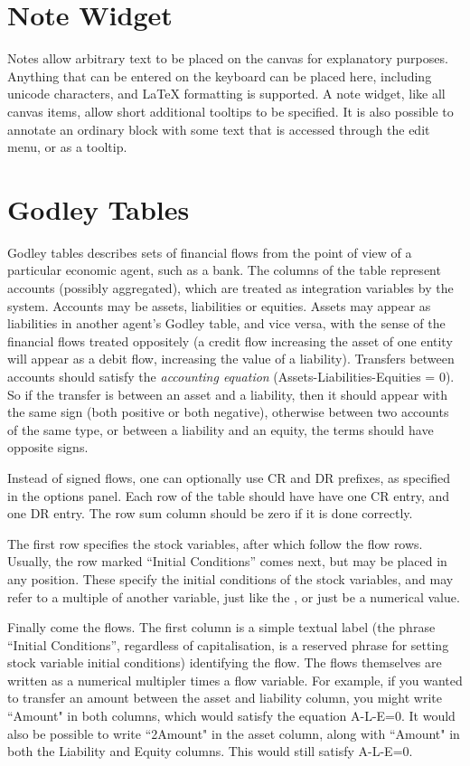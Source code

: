 \section{Note Widget}
 \label{Notes}\label{Item} Notes allow arbitrary text to be
placed on the canvas for explanatory purposes. Anything that can be
entered on the keyboard can be placed here, including unicode
characters, and LaTeX formatting is supported. A note
widget, like all canvas items, allow short additional tooltips to be
specified. It is also possible to annotate an ordinary block with some text
that is accessed through the edit menu, or as a tooltip.

\section{Godley Tables}\label{godley}\label{GodleyIcon}

Godley tables describes sets of financial flows from the point of view
of a particular economic agent, such as a bank. The columns of the
table represent accounts (possibly aggregated), which are treated as
integration variables by the system. Accounts may be assets,
liabilities or equities. Assets may appear as liabilities in another
agent's Godley table, and vice versa, with the sense of the financial
flows treated oppositely (a credit flow increasing the asset of one
entity will appear as a debit flow, increasing the value of a
liability). Transfers between accounts should satisfy the {\em
  accounting equation}
(Assets-Liabilities-Equities = 0). So if the transfer is between an
asset and a liability, then it should appear with the same sign (both
positive or both negative), otherwise between two accounts of the same
type, or between a liability and an equity, the terms should have
opposite signs.

Instead of signed flows, one can optionally use CR and DR prefixes, as
specified in the options panel. Each row of the table should have have
one CR entry, and one DR entry. The row sum column should be zero if
it is done correctly.

The first row specifies the stock variables, after which follow the
flow rows. Usually, the row marked ``Initial Conditions'' comes next,
but may be placed in any position. These specify the initial
conditions of the stock variables, and may refer to a multiple of
another variable, just like the , or just be a numerical value.

Finally come the flows. The first column is a simple textual label
(the phrase ``Initial Conditions'', regardless of capitalisation, is a
reserved phrase for setting stock variable initial conditions)
identifying the flow. The flows themselves are written as a numerical
multipler times a flow variable. For example, if you wanted to transfer
an amount between the asset and liability column, you might write
``Amount" in both columns, which would satisfy the equation A-L-E=0.
It would also be possible to write ``2Amount" in the asset column, 
along with ``Amount" in both the Liability and Equity columns. This would
still satisfy A-L-E=0.

